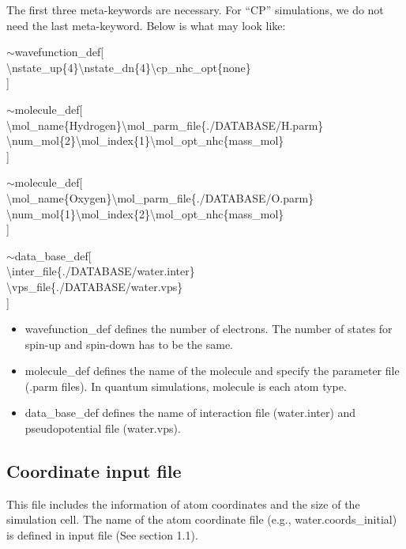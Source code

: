 \documentclass[letterpaper,12pt]{article}
\begin{document}
The first three meta-keywords are necessary. For ``CP'' simulations, we do not need the last meta-keyword. Below is what {\selectfont{water.set}} may look like:

{\selectfont
$\sim$wavefunction\_def[\\
\textbackslash nstate\_up\{4\}\textbackslash nstate\_dn\{4\}\textbackslash cp\_nhc\_opt\{none\}\\
 ]

$\sim$molecule\_def[\\
\textbackslash mol\_name\{Hydrogen\}\textbackslash mol\_parm\_file\{./DATABASE/H.parm\}\\
\textbackslash num\_mol\{2\}\textbackslash mol\_index\{1\}\textbackslash mol\_opt\_nhc\{mass\_mol\}\\
]

$\sim$molecule\_def[\\
\textbackslash mol\_name\{Oxygen\}\textbackslash mol\_parm\_file\{./DATABASE/O.parm\}\\
\textbackslash num\_mol\{1\}\textbackslash mol\_index\{2\}\textbackslash mol\_opt\_nhc\{mass\_mol\}\\
]

$\sim$data\_base\_def[\\
\textbackslash inter\_file\{./DATABASE/water.inter\}\\
\textbackslash vps\_file\{./DATABASE/water.vps\}\\
]

}
\begin{itemize}
\item {\selectfont wavefunction\_def} defines the number of electrons. The number of states for spin-up and spin-down has to be the same. 

\item {\selectfont molecule\_def }defines the name of the molecule and specify the parameter file (.parm files). In quantum simulations, molecule is each atom type. 

\item {\selectfont data\_base\_def} defines the name of interaction file (water.inter) and pseudopotential file (water.vps).  
\end{itemize}

\subsection{Coordinate input file}
This file includes the information of atom coordinates and the size of the simulation cell. The name of the atom coordinate file (e.g., water.coords\_initial) is defined in input file (See section 1.1).
\end{document}
